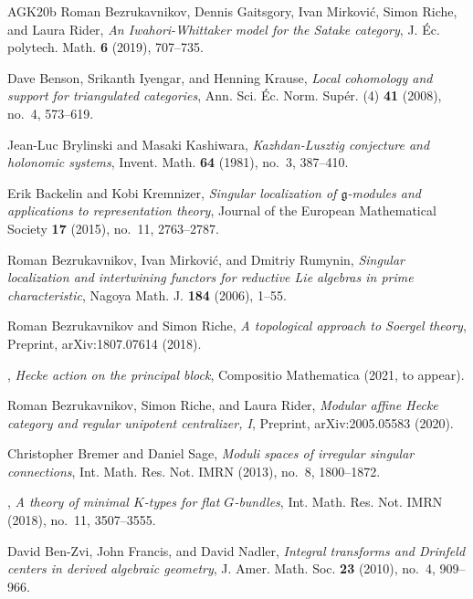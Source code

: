 \begin{thebibliography}{AGK{\etalchar{+}}20b}
Roman Bezrukavnikov, Dennis Gaitsgory, Ivan Mirkovi\'{c}, Simon Riche, and
  Laura Rider, \emph{An {I}wahori-{W}hittaker model for the {S}atake category},
  J. \'{E}c. polytech. Math. \textbf{6} (2019), 707--735.

Dave Benson, Srikanth Iyengar, and Henning Krause, \emph{Local cohomology and
  support for triangulated categories}, Ann. Sci. \'{E}c. Norm. Sup\'{e}r. (4)
  \textbf{41} (2008), no.~4, 573--619.

Jean-Luc Brylinski and Masaki Kashiwara, \emph{Kazhdan-{L}usztig conjecture and
  holonomic systems}, Invent. Math. \textbf{64} (1981), no.~3, 387--410.

Erik Backelin and Kobi Kremnizer, \emph{Singular localization of
  $\mathfrak{g}$-modules and applications to representation theory}, Journal of
  the European Mathematical Society \textbf{17} (2015), no.~11, 2763--2787.

Roman Bezrukavnikov, Ivan Mirkovi\'{c}, and Dmitriy Rumynin, \emph{Singular
  localization and intertwining functors for reductive {L}ie algebras in prime
  characteristic}, Nagoya Math. J. \textbf{184} (2006), 1--55.

Roman Bezrukavnikov and Simon Riche, \emph{A topological approach to {S}oergel
  theory}, Preprint, arXiv:1807.07614 (2018).

\bysame, \emph{Hecke action on the principal block}, Compositio Mathematica
  (2021, to appear).

Roman Bezrukavnikov, Simon Riche, and Laura Rider, \emph{Modular affine {H}ecke
  category and regular unipotent centralizer, {I}}, Preprint, arXiv:2005.05583
  (2020).

Christopher Bremer and Daniel Sage, \emph{Moduli spaces of irregular singular
  connections}, Int. Math. Res. Not. IMRN (2013), no.~8, 1800--1872.

\bysame, \emph{A theory of minimal {$K$}-types for flat {$G$}-bundles}, Int.
  Math. Res. Not. IMRN (2018), no.~11, 3507--3555.

David Ben-Zvi, John Francis, and David Nadler, \emph{Integral transforms and
  {D}rinfeld centers in derived algebraic geometry}, J. Amer. Math. Soc.
  \textbf{23} (2010), no.~4, 909--966.


\end{thebibliography}
